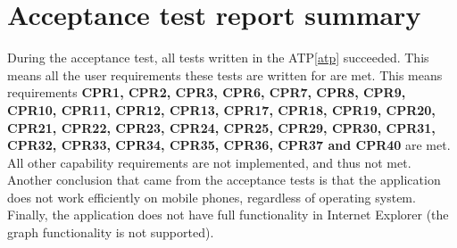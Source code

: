 \chapter{Acceptance test report summary}
\label{chap:testreports}

During the acceptance test, all tests written in the ATP\ref{atp} succeeded. This means all the user requirements these tests are written for are met. This means requirements \textbf{CPR1, CPR2, CPR3, CPR6, CPR7, CPR8, CPR9, CPR10, CPR11, CPR12, CPR13, CPR17, CPR18, CPR19, CPR20, CPR21, CPR22, CPR23, CPR24, CPR25, CPR29, CPR30, CPR31, CPR32, CPR33, CPR34, CPR35, CPR36, CPR37 and CPR40} are met. All other capability requirements are not implemented, and thus not met. Another conclusion that came from the acceptance tests is that the application does not work efficiently on mobile phones, regardless of operating system. Finally, the application does not have full functionality in Internet Explorer (the graph functionality is not supported).
